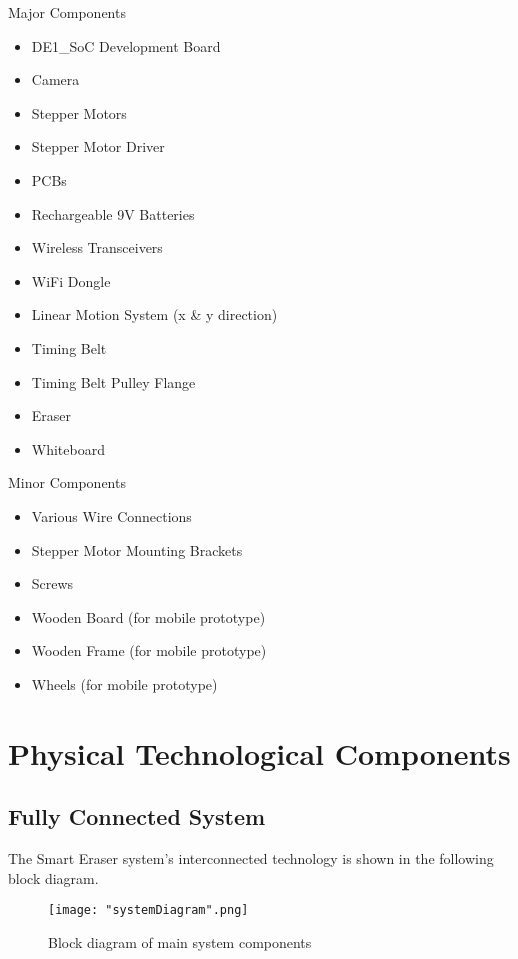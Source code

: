 Major Components
\begin{itemize}
	\item DE1\_SoC Development Board
	\item Camera
	\item Stepper Motors
	\item Stepper Motor Driver
	\item PCBs
	\item Rechargeable 9V Batteries
	\item Wireless Transceivers
	\item WiFi Dongle
	\item Linear Motion System (x \& y direction)
	\item Timing Belt
	\item Timing Belt Pulley Flange
	\item Eraser
	\item Whiteboard \\
\end{itemize}

Minor Components
\begin{itemize}
	\item Various Wire Connections
	\item Stepper Motor Mounting Brackets
	\item Screws
	\item Wooden Board (for mobile prototype)
	\item Wooden Frame (for mobile prototype)
	\item Wheels (for mobile prototype) \\
\end{itemize} \par 

\section{Physical Technological Components}

\subsection{Fully Connected System}

The Smart Eraser system's interconnected technology is shown in the following block diagram. 

\begin{figure}[H]
	\centering
	{\texttt{[image: "systemDiagram".png]}}
	\caption{Block diagram of main system components}
	\label{fig:bd1}
\end{figure}

